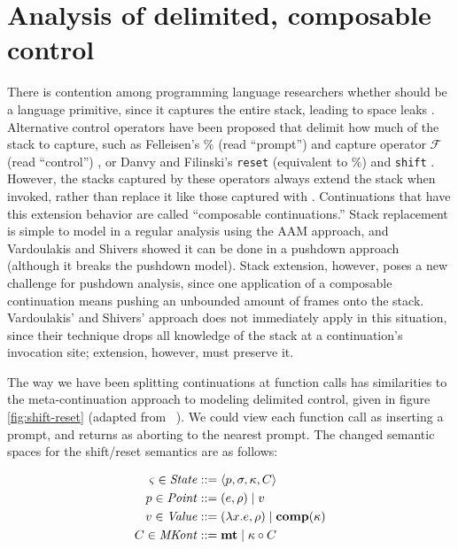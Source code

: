 \documentclass{llncs}
\newcommand{\Scribtexttt}[1]{{\texttt{#1}}}
\newcommand{\SColorize}[2]{\color{#1}{#2}}
\newcommand{\inColor}[2]{{\Scribtexttt{\SColorize{#1}{#2}}}}
\newcommand{\rackett}[1]{\inColor{black}{#1}}
\begin{document}
\section{Analysis of delimited, composable control}
\label{sec:sr}

There is contention among programming language researchers whether
\rackett{call/cc} should be a language primitive, since it captures
the entire stack, leading to space leaks
\citep{ianjohnson:kiselyov:against-callcc}. Alternative control
operators have been proposed that delimit how much of the stack to
capture, such as Felleisen's $\%$ (read ``prompt'') and capture
operator ${\mathcal F}$ (read ``control'')
\citep{ianjohnson:felleisen:control:1988}, or Danvy and Filinski's
\texttt{reset} (equivalent to $\%$) and \texttt{shift}
\citep{ianjohnson:danvy:filinski:delim:1990}. However, the stacks
captured by these operators always extend the stack when invoked,
rather than replace it like those captured with
\rackett{call/cc}. Continuations that have this extension behavior are
called ``composable continuations.'' Stack replacement is simple to
model in a regular analysis using the AAM approach, and Vardoulakis
and Shivers showed it can be done in a pushdown approach (although it
breaks the pushdown model). Stack extension, however, poses a new
challenge for pushdown analysis, since one application of a composable
continuation means pushing an unbounded amount of frames onto the
stack. Vardoulakis' and Shivers' approach does not immediately apply
in this situation, since their technique drops all knowledge of the
stack at a continuation's invocation site; extension, however, must
preserve it.

The way we have been splitting continuations at function calls has
similarities to the meta-continuation approach to modeling delimited
control, given in figure \ref{fig:shift-reset} (adapted from
~\citep{ianjohnson:Biernacki2006274}). We could view each function
call as inserting a prompt, and returns as aborting to the nearest
prompt. The changed semantic spaces for the shift/reset semantics are as
follows:

\begin{align*}
  \varsigma \in \mathit{State} &::= \langle p, \sigma, \kappa, C \rangle \\
  p \in \mathit{Point} &::= (e, \rho) \mid v \\
  v \in \mathit{Value} &::= (\lambda{} x. e, \rho) \mid \mathbf{comp}(\kappa) \\
  C \in \mathit{MKont} &::= \mathbf{mt} \mid \kappa\circ C
\end{align*}
\end{document}
